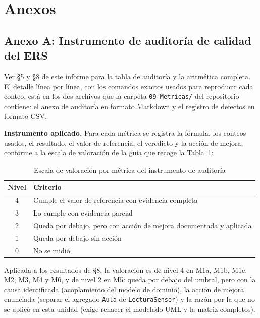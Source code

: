 \section*{Anexos}

\subsection*{Anexo A: Instrumento de auditor\'ia de calidad del ERS}

Ver \S5 y \S8 de este informe para la tabla de auditor\'ia y la aritm\'etica completa. El detalle l\'inea por l\'inea, con los comandos exactos usados para reproducir cada conteo, est\'a en los dos archivos que la carpeta \texttt{09\_Metricas/} del repositorio contiene: el anexo de auditor\'ia en formato Markdown y el registro de defectos en formato CSV.

\textbf{Instrumento aplicado.} Para cada m\'etrica se registra la f\'ormula, los conteos usados, el resultado, el valor de referencia, el veredicto y la acci\'on de mejora, conforme a la escala de valoraci\'on de la gu\'ia que recoge la Tabla~\ref{tab:escala-auditoria}:

\begin{table}[H]
\centering
\small
\begin{tabular}{|c|p{11.0cm}|}
\hline
\textbf{Nivel} & \textbf{Criterio} \\ \hline
4 & Cumple el valor de referencia con evidencia completa \\ \hline
3 & Lo cumple con evidencia parcial \\ \hline
2 & Queda por debajo, pero con acci\'on de mejora documentada y aplicada \\ \hline
1 & Queda por debajo sin acci\'on \\ \hline
0 & No se midi\'o \\ \hline
\end{tabular}
\caption{Escala de valoraci\'on por m\'etrica del instrumento de auditor\'ia}
\label{tab:escala-auditoria}
\end{table}

Aplicada a los resultados de \S8, la valoraci\'on es de nivel 4 en M1a, M1b, M1c, M2, M3, M4 y M6, y de nivel 2 en M5: queda por debajo del umbral, pero con la causa identificada (acoplamiento del modelo de dominio), la acci\'on de mejora enunciada (separar el agregado \texttt{Aula} de \texttt{LecturaSensor}) y la raz\'on por la que no se aplic\'o en esta unidad (exige rehacer el modelado UML y la matriz completos).

